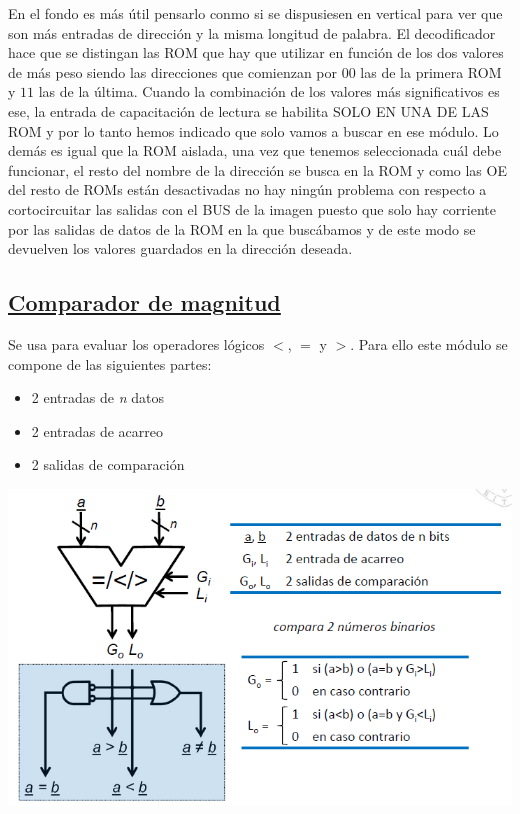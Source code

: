 \documentclass[a4paper,10pt]{book}
\begin{document}
\begin{itemize}
En el fondo es más útil pensarlo conmo si se dispusiesen en vertical para ver que son más entradas de dirección y la misma longitud de palabra. El decodificador hace que se distingan las ROM que hay que utilizar en función de los dos valores de más peso siendo las direcciones que comienzan por $00$ las de la primera ROM y $11$ las de la última. Cuando la combinación de los valores más significativos es ese, la entrada de capacitación de lectura se habilita SOLO EN UNA DE LAS ROM y por lo tanto hemos indicado que solo vamos a buscar en ese módulo. Lo demás es igual que la ROM aislada, una vez que tenemos seleccionada cuál debe funcionar, el resto del nombre de la dirección se busca en la ROM y como las OE del resto de ROMs están desactivadas no hay ningún problema con respecto a cortocircuitar las salidas con el BUS de la imagen puesto que solo hay corriente por las salidas de datos de la ROM en la que buscábamos y de este modo se devuelven los valores guardados en la dirección deseada.

\end{itemize}

\subsection*{\underline{Comparador de magnitud}}
Se usa para evaluar los operadores lógicos $<$, $=$ y $>$. Para ello este módulo se compone de las siguientes partes:
\begin{itemize}
\item 2 entradas de \textit{n} datos
\item 2 entradas de acarreo
\item 2 salidas de comparación
\end{itemize}

\begin{center}
\includegraphics[scale=0.65]{comparador_magnitud}
\end{center}
\end{document}
